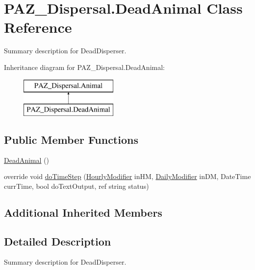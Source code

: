 \hypertarget{class_p_a_z___dispersal_1_1_dead_animal}{\section{P\-A\-Z\-\_\-\-Dispersal.\-Dead\-Animal Class Reference}
\label{class_p_a_z___dispersal_1_1_dead_animal}
}


Summary description for Dead\-Disperser.  


Inheritance diagram for P\-A\-Z\-\_\-\-Dispersal.\-Dead\-Animal\-:\begin{figure}[H]
\begin{center}
\leavevmode
\includegraphics[height=2.000000cm]{class_p_a_z___dispersal_1_1_dead_animal}
\end{center}
\end{figure}
\subsection*{Public Member Functions}
\begin{DoxyCompactItemize}
\item 
\hyperlink{class_p_a_z___dispersal_1_1_dead_animal_a47e97f2177f0f8a95e0882ee2721c567}{Dead\-Animal} ()
\item 
override void \hyperlink{class_p_a_z___dispersal_1_1_dead_animal_a00104210ca55f2d6187a00db26d776ed}{do\-Time\-Step} (\hyperlink{class_p_a_z___dispersal_1_1_hourly_modifier}{Hourly\-Modifier} in\-H\-M, \hyperlink{class_p_a_z___dispersal_1_1_daily_modifier}{Daily\-Modifier} in\-D\-M, Date\-Time curr\-Time, bool do\-Text\-Output, ref string status)
\end{DoxyCompactItemize}
\subsection*{Additional Inherited Members}


\subsection{Detailed Description}
Summary description for Dead\-Disperser. 



